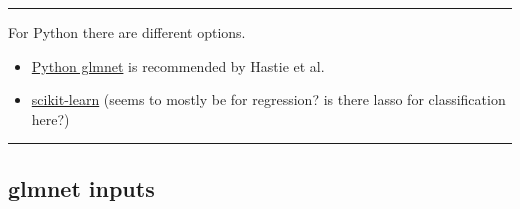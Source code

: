 \documentclass[
  letterpaper,
  DIV=11,
  numbers=noendperiod]{scrartcl}
\providecommand{\tightlist}{%
  \setlength{\itemsep}{0pt}\setlength{\parskip}{0pt}}\usepackage{longtable,booktabs,array}
\begin{document}
\begin{center}\rule{0.5\linewidth}{0.5pt}\end{center}

For Python there are different options.

\begin{itemize}
\tightlist
\item
  \href{https://web.stanford.edu/~hastie/glmnet_python/}{Python glmnet}
  is recommended by Hastie et al.
\item
  \href{https://scikit-learn.org/stable/modules/linear_model.html\#ridge-regression-and-classification}{scikit-learn}
  (seems to mostly be for regression? is there lasso for classification
  here?)
\end{itemize}

\begin{center}\rule{0.5\linewidth}{0.5pt}\end{center}

\hypertarget{glmnet-inputs}{%
\subsection{glmnet inputs}\label{glmnet-inputs}}
\end{document}

